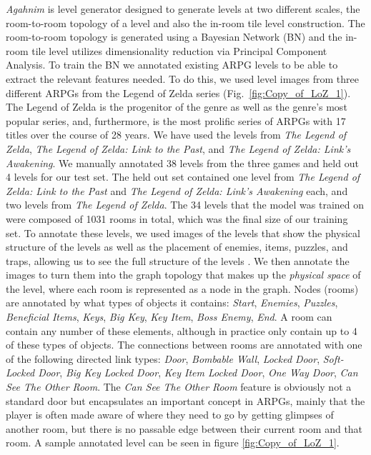 \documentclass[12pt]{report}
\begin{document}
\textit{Agahnim} is level generator designed to generate levels at two different scales, the room-to-room topology of a level and also the in-room tile level construction.  The room-to-room topology is generated using a Bayesian Network (BN) and the in-room tile level utilizes dimensionality reduction via Principal Component Analysis.  To train the BN we annotated existing ARPG levels to be able to extract the relevant features needed. To do this, we used level images from three different ARPGs from the Legend of Zelda series (Fig.~\ref{fig:Copy_of_LoZ_1}). The Legend of Zelda is the progenitor of the genre as well as the genre's most popular series, and, furthermore, is the most prolific series of ARPGs with 17 titles over the course of 28 years. We have used the levels from \textit{The Legend of Zelda}, \textit{The Legend of Zelda: Link to the Past}, and \textit{The Legend of Zelda: Link's Awakening}. We manually annotated 38 levels from the three games and held out 4 levels for our test set. The held out set contained one level from \textit{The Legend of Zelda: Link to the Past} and \textit{The Legend of Zelda: Link's Awakening} each, and two levels from \textit{The Legend of Zelda}. The 34 levels that the model was trained on were composed of 1031 rooms in total, which was the final size of our training set. To annotate these levels, we used images of the levels that show the physical structure of the levels as well as the placement of enemies, items, puzzles, and traps, allowing us to see the full structure of the levels \cite{ZELDASHRINE,ANGELFIRE,ZELDAELEMENTS,IANALBERT}. We then annotate the images to turn them into the graph topology that makes up the \textit{physical space} of the level, where each room is represented as a node in the graph. Nodes (rooms) are annotated by what types of objects it contains: \textit{Start}, \textit{Enemies}, \textit{Puzzles}, \textit{Beneficial Items}, \textit{Keys}, \textit{Big Key}, \textit{Key Item}, \textit{Boss Enemy}, \textit{End}.  A room can contain any number of these elements, although in practice only contain up to 4 of these types of objects.  
 The connections between rooms are annotated with one of the following directed link types:   \textit{Door}, \textit{Bombable Wall}, \textit{Locked Door}, \textit{Soft-Locked Door}, \textit{Big Key Locked Door}, \textit{Key Item Locked Door}, \textit{One Way Door}, \textit{Can See The Other Room}. The \textit{Can See The Other Room} feature is obviously not a standard door but encapsulates an important concept in ARPGs, mainly that the player is often made aware of where they need to go by getting glimpses of another room, but there is no passable edge between their current room and that room.  A sample annotated level can be seen in figure \ref{fig:Copy_of_LoZ_1}.
\end{document}
